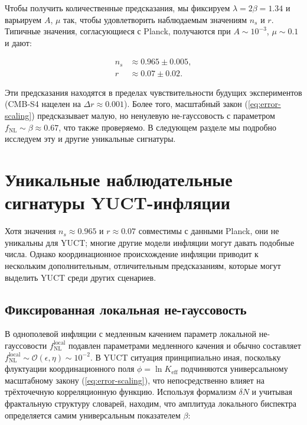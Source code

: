 \documentclass[11pt,a4paper]{article}
\newcommand{\Keff}{K_{\mathrm{eff}}}
\newcommand{\rs}{r}
\begin{document}
	Чтобы получить количественные предсказания, мы фиксируем \(\lambda = 2\beta = 1.34\) и варьируем \(A\), \(\mu\) так, чтобы удовлетворить наблюдаемым значениям \(n_s\) и \(\rs\). Типичные значения, согласующиеся с Planck, получаются при \(A \sim 10^{-3}\), \(\mu \sim 0.1\) и дают:
	
	\begin{align}
		n_s &\approx 0.965 \pm 0.005, \\
		\rs &\approx 0.07 \pm 0.02.
	\end{align}
	
	Эти предсказания находятся в пределах чувствительности будущих экспериментов (CMB‑S4 нацелен на \(\Delta r \approx 0.001\)). Более того, масштабный закон (\ref{eq:error-scaling}) предсказывает малую, но ненулевую не-гауссовость с параметром \(f_{\mathrm{NL}} \sim \beta \approx 0.67\), что также проверяемо. В следующем разделе мы подробно исследуем эту и другие уникальные сигнатуры.
	
	\section{Уникальные наблюдательные сигнатуры YUCT-инфляции}
	\label{sec:signatures}
	
	Хотя значения \(n_s \approx 0.965\) и \(r \approx 0.07\) совместимы с данными Planck, они не уникальны для YUCT; многие другие модели инфляции могут давать подобные числа. Однако координационное происхождение инфляции приводит к нескольким дополнительным, отличительным предсказаниям, которые могут выделить YUCT среди других сценариев.
	
	\subsection{Фиксированная локальная не-гауссовость}
	
	В однополевой инфляции с медленным качением параметр локальной не-гауссовости \(f_{\text{NL}}^{\text{local}}\) подавлен параметрами медленного качения и обычно составляет \(f_{\text{NL}}^{\text{local}} \sim \mathcal{O}(\epsilon, \eta) \sim 10^{-2}\). В YUCT ситуация принципиально иная, поскольку флуктуации координационного поля \(\phi = \ln \Keff\) подчиняются универсальному масштабному закону (\ref{eq:error-scaling}), что непосредственно влияет на трёхточечную корреляционную функцию. Используя формализм \(\delta N\) и учитывая фрактальную структуру словарей, находим, что амплитуда локального биспектра определяется самим универсальным показателем \(\beta\):
	
\end{document}
